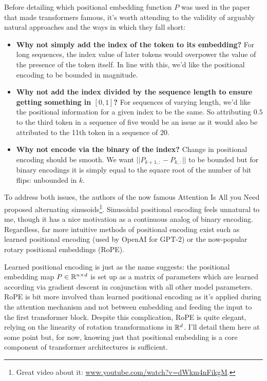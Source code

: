 \documentclass[11pt]{article}
\begin{document}
Before detailing which positional embedding function $P$ was used in the paper that made transformers famous, it's worth attending to the validity of arguably natural approaches and the ways in which they fall short:
\begin{itemize}
    \item \textbf{Why not simply add the index of the token to its embedding?} For long sequences, the index value of later tokens would overpower the value of the presence of the token itself. In line with this, we'd like the positional encoding to be bounded in magnitude.
    \item \textbf{Why not add the index divided by the sequence length to ensure getting something in $[0,1]$?} For sequences of varying length, we'd like the positional information for a given index to be the same. So attributing $0.5$ to the third token in a sequence of five would be an issue as it would also be attributed to the 11th token in a sequence of $20$.
    \item \textbf{Why not encode via the binary of the index?} Change in positional encoding should be smooth. We want $||P_{k+1,:}-P_{k,:}||$ to be bounded but for binary encodings it is simply equal to the square root of the number of bit flips: unbounded in $k$.
\end{itemize}
To address both issues, the authors of the now famous Attention Is All you Need proposed alternating sinusoids\footnote{Great video about it: \url{www.youtube.com/watch?v=dWkm4nFikgM}.}. Sinusoidal positional encoding feels unnatural to me, though it has a nice motivation as a continuous analog of binary encoding. Regardless, far more intuitive methods of positional encoding exist such as learned positional encoding (used by OpenAI for GPT-2) or the now-popular rotary positional embeddings (RoPE).

Learned positional encoding is just as the name suggests: the positional embedding map $P\in\mathbb{R}^{n\times d}$ is set up as a matrix of parameters which are learned according via gradient descent in conjunction with all other model parameters. RoPE is bit more involved than learned positional encoding as it's applied during the attention mechanism and not between embedding and feeding the input to the first transformer block. Despite this complication, RoPE is quite elegant, relying on the linearity of rotation transformations in $\mathbb{R}^d$. I'll detail them here at some point but, for now, knowing just that positional embedding is a core component of transformer architectures is sufficient.
\end{document}
